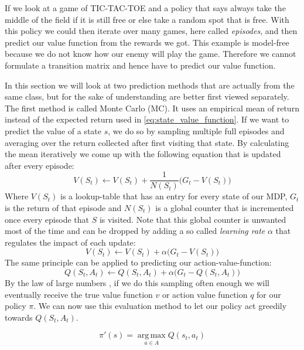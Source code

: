 If we look at a game of TIC-TAC-TOE and a policy that says always take the middle of the field if it is still free or else take a random spot that is free.
With this policy we could then iterate over many games, here called \emph{episodes}, and then predict our value function from the rewards we got.
This example is model-free because we do not know how our enemy will play the game.
Therefore we cannot formulate a transition matrix and hence have to predict our value function.


In this section we will look at two prediction methods that are actually from the same class, but for the sake of understanding are better first viewed separately.
The first method is called Monte Carlo (MC).
It uses an empirical mean of return instead of the expected return used in \ref{eq:state_value_function}.
If we want to predict the value of a state $s$, we do so by sampling multiple full episodes and averaging over the return collected after first visiting that state.
By calculating the mean iteratively we come up with the following equation that is updated after every episode:
\begin{equation} \label{eq:mc_v_counter}
	V(S_t) \leftarrow V(S_t) + \frac{1}{N(S_t)} \big(G_t - V(S_t)\big)
\end{equation}
Where $V(S_t)$ is a lookup-table that has an entry for every state of our MDP, $G_t$ is the return of that episode and $N(S_t)$ is a global counter that is incremented once every episode that $S$ is visited.
Note that this global counter is unwanted most of the time and can be dropped by adding a so called \emph{learning rate} $\alpha$ that regulates the impact of each update:
\begin{equation} \label{eq:mc_v}
	V(S_t) \leftarrow V(S_t) + \alpha \big(G_t - V(S_t)\bigr)
\end{equation}
The same principle can be applied to predicting our action-value-function:
\begin{equation} \label{eq:mc_q}
	Q(S_t, A_t) \leftarrow Q(S_t, A_t) + \alpha \big(G_t - Q(S_t, A_t)\big)
\end{equation}
By the law of large numbers \cite{large_numbers}, if we do this sampling often enough we will eventually receive the true value function $v$ or action value function $q$ for our policy $\pi$.
We can now use this evaluation method to let our policy act greedily towards $Q(S_t, A_t)$.
\begin{defn}
\begin{equation} \label{eq:pi_dash}
	\pi '(s) = \operatorname*{arg\,max}_{a \in A} Q(s_t, a_t)
\end{equation}
\end{defn}
